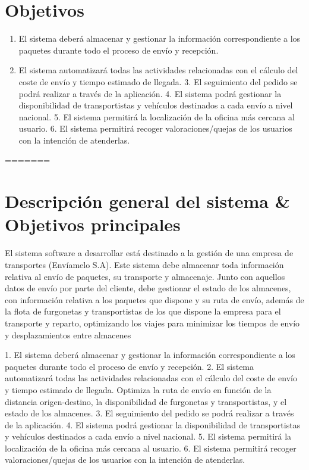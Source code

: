 \section{Objetivos}
\begin{enumerate}
	\item El sistema deberá almacenar y gestionar la información correspondiente a los paquetes durante todo el proceso de envío y recepción.
	\item El sistema automatizará todas las actividades relacionadas con el cálculo del coste de envío y tiempo estimado de llegada.
	3. El seguimiento del pedido se podrá realizar a través de la aplicación.
	4. El sistema podrá gestionar la disponibilidad de transportistas y vehículos destinados a cada envío a nivel nacional.
	5. El sistema permitirá la localización de la oficina más cercana al usuario.
	6. El sistema permitirá recoger valoraciones/quejas de los usuarios con la intención de atenderlas.
	
\end{enumerate} 
=======
\section{Descripción general del sistema & Objetivos principales}
El sistema software a desarrollar está destinado a la gestión de una empresa de transportes (Envíamelo S.A). Este sistema debe almacenar toda información relativa al envío de paquetes, su transporte y almacenaje. Junto con aquellos datos de envío por parte del cliente, debe gestionar el estado de los almacenes, con información relativa a los paquetes que dispone y su ruta de envío, además de la flota de furgonetas y transportistas de los que dispone la empresa para el transporte y reparto, optimizando los viajes para minimizar los tiempos de envío y desplazamientos entre almacenes

1. El sistema deberá almacenar y gestionar la información correspondiente a los paquetes durante todo el proceso de envío y recepción.
2. El sistema automatizará todas las actividades relacionadas con el cálculo del coste de envío y tiempo estimado de llegada. Optimiza la ruta de envío en función de la distancia origen-destino, la disponibilidad de furgonetas y transportistas, y el estado de los almacenes.
3. El seguimiento del pedido se podrá realizar a través de la aplicación.
4. El sistema podrá gestionar la disponibilidad de transportistas y vehículos destinados a cada envío a nivel nacional.
5. El sistema permitirá la localización de la oficina más cercana al usuario.
6. El sistema permitirá recoger valoraciones/quejas de los usuarios con la intención de atenderlas.
 
